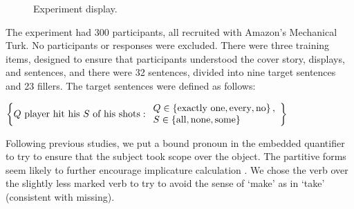 \documentclass[leqno]{article}
\begin{document}
\begin{figure}[t]
  \centering
  \caption{Experiment display.}
  \label{fig:exp1}
\end{figure}

The experiment had 300 participants, all recruited with Amazon's
Mechanical Turk. No participants or responses were excluded. There
were three training items, designed to ensure that participants
understood the cover story, displays, and sentences, and there were 32
sentences, divided into nine target sentences and 23 fillers.  The
target sentences were defined as follows:
%
\begin{examples}
\item\label{expmsgs} 
    $\left\{ 
      \text{$Q$ player hit his $S$ of his shots} :
      \begin{array}{l}        
        Q \in \left\{ \text{exactly one}, \text{every}, \text{no} \right\}, \\
        S \in \left\{ \text{all}, \text{none}, \text{some} \right\}
      \end{array} \right\}$
\end{examples}
%
Following previous studies, we put a bound pronoun in the embedded
quantifier to try to ensure that the subject took scope over the
object. The partitive forms seem likely to further encourage
implicature calculation \citep{Grodner-etal:2010}. We chose the verb
 over the slightly less marked verb  to try to
avoid the sense of `make' as in `take' (consistent with missing).
\end{document}
